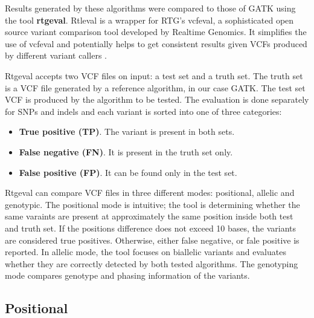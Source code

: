 Results generated by these algorithms were compared to those of GATK using the tool\textbf{ rtgeval}. Rtleval is a wrapper for RTG's vcfeval, a sophisticated open source variant comparison tool developed by Realtime Genomics. It simplifies the use of vcfeval and potentially helps to get consistent results given VCFs produced by different variant callers \cite{rtgeval}.

Rtgeval accepts two VCF files on input: a test set and a truth set. The truth set is a VCF file generated by a reference algorithm, in our case GATK. The test set VCF is produced by the algorithm to be tested. The evaluation is done separately for SNPs and indels and each variant is sorted into one of three categories:
\begin{itemize}
\item \textbf{True positive (TP)}. The variant is present in both sets.
\item \textbf{False negative (FN)}. It is present in the truth set only.
\item \textbf{False positive (FP)}. It can be found only in the test set.
\end{itemize}

Rtgeval can compare VCF files in three different modes: positional, allelic and genotypic. The positional mode is intuitive; the tool is determining whether the same varaints are present at approximately the same position inside both test and truth set. If the positions difference does not exceed 10 bases, the variants are considered true positives. Otherwise, either false negative, or fale positive is reported. In allelic mode, the tool focuses on biallelic variants and evaluates whether they are correctly detected by both tested algorithms. The genotyping mode compares genotype and phasing information of the variants.

\subsection{Positional}
\label{subsec:positional-results}

